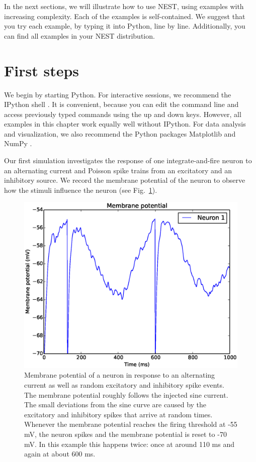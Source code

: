 \documentclass{article}
\begin{document}
In the next sections, we will illustrate how to use NEST, using
examples with increasing complexity. Each of the examples is
self-contained. We suggest that you try each example, by typing it
into Python, line by line. Additionally, you can find all examples in
your NEST distribution.

\section{First steps}

We begin by starting Python. For interactive sessions, we recommend
the IPython shell \citep{Pere:2007(21)}. It is convenient,
because you can edit the command line and access previously typed
commands using the up and down keys. However, all examples in this
chapter work equally well without IPython. For data analysis and
visualization, we also recommend the Python packages Matplotlib
\citep{Hunt:2007(90)} and NumPy \citep{Olip:Guid}.

Our first simulation investigates the response of one
integrate-and-fire neuron to an alternating current and Poisson spike
trains from an excitatory and an inhibitory source. We record the
membrane potential of the neuron to observe how the stimuli influence
the neuron (see Fig.~\ref{nest:fig:voltagetrace}).

\begin{figure}[!tbp]
\centering
\includegraphics[width=0.7\linewidth]{figures/voltage_trace.eps}
\caption{\label{nest:fig:voltagetrace} Membrane potential of a neuron
  in response to an alternating current as well as random excitatory
  and inhibitory spike events. The membrane potential roughly follows
  the injected sine current. The small deviations from the sine curve are
  caused by the excitatory and inhibitory spikes that arrive at random
  times. Whenever the membrane potential reaches the firing threshold
  at -55 mV, the neuron spikes and the membrane potential is reset to
  -70 mV. In this example this happens twice: once at around 110 ms
  and again at about 600 ms.}
\end{figure}
\end{document}
